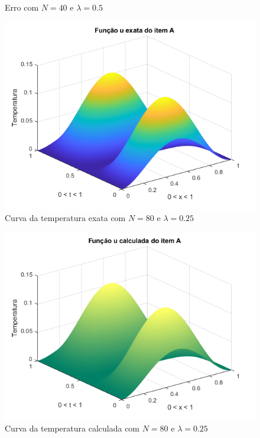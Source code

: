 \documentclass[12pt]{article}
\begin{document}
\begin{spacing}{1.5}
\begin{figure}
    \caption{Erro com $N=40$ e $\lambda=0.5$}
    \label{fig:A_n40lambda0-5_erro}
\end{figure}


\begin{figure}
    \centering
    \includegraphics[width=0.8\linewidth]{Primeira_Tarefa/ItemA/n80_lambda0-25_exata.png}
    \caption{Curva da temperatura exata com $N=80$ e $\lambda=0.25$}
    \label{fig:A_n80lambda0-25_exata}
\end{figure}
\begin{figure}
    \centering
    \includegraphics[width=0.8\linewidth]{Primeira_Tarefa/ItemA/n80_lambda0-25_calc.png}
    \caption{Curva da temperatura calculada com $N=80$ e $\lambda=0.25$}
    \label{fig:A_n80lambda0-25_calc}
\end{figure}
\begin{figure}
    \centering

\end{figure}
\end{spacing}
\end{document}
